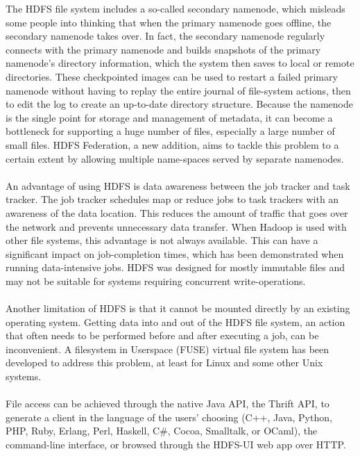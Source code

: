 \documentclass[a4paper,12pt,oneside]{report}
\begin{document}
\begin{enumerate}
                The HDFS file system includes a so-called secondary namenode, which misleads some people into thinking that when the primary namenode goes offline, the secondary namenode takes over. In fact, the secondary namenode regularly connects with the primary namenode and builds snapshots of the primary namenode's directory information, which the system then saves to local or remote directories. These checkpointed images can be used to restart a failed primary namenode without having to replay the entire journal of file-system actions, then to edit the log to create an up-to-date directory structure. Because the namenode is the single point for storage and management of metadata, it can become a bottleneck for supporting a huge number of files, especially a large number of small files. HDFS Federation, a new addition, aims to tackle this problem to a certain extent by allowing multiple name-spaces served by separate namenodes.\\
                \\
                An advantage of using HDFS is data awareness between the job tracker and task tracker. The job tracker schedules map or reduce jobs to task trackers with an awareness of the data location.
                This reduces the amount of traffic that goes over the network and prevents unnecessary data transfer. When Hadoop is used with other file systems, this advantage is not always available. This can have a significant impact on job-completion times, which has been demonstrated when running data-intensive jobs. HDFS was designed for mostly immutable files and may not be suitable for systems requiring concurrent write-operations.\\
                \\
                Another limitation of HDFS is that it cannot be mounted directly by an existing operating system. Getting data into and out of the HDFS file system, an action that often needs to be performed before and after executing a job, can be inconvenient. A filesystem in Userspace (FUSE) virtual file system has been developed to address this problem, at least for Linux and some other Unix systems.\\
                \\
                File access can be achieved through the native Java API, the Thrift API, to generate a client in the language of the users' choosing (C++, Java, Python, PHP, Ruby, Erlang, Perl, Haskell, C\#, Cocoa, Smalltalk, or OCaml), the command-line interface, or browsed through the HDFS-UI web app over HTTP.


\end{enumerate}
\end{document}
